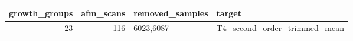 \begin{tabular}{rrll}
\toprule
growth_groups & afm_scans & removed_samples & target \\
\midrule
23 & 116 & 6023,6087 & T4_second_order_trimmed_mean \\
\bottomrule
\end{tabular}
